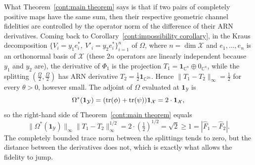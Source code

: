 What Theorem~\ref{cont:main theorem} says is that if two pairs of completely positive maps have the same sum, then their respective geometric channel fidelities are controlled by the operator norm of the difference of their ARN derivatives. Coming back to Corollary~\ref{cont:impossibility corollary}, in the Kraus decomposition $\{V_i=y_1e_i^*,\ V'_i=y_2e_i^*\}_{i=1}^{n}$ of $\Omega$, where $n=\dim\mathcal{X}$ and $e_1,\dots,e_n$ is an orthonormal basis of $\mathcal{X}$ (these $2n$ operators are linearly independent because $y_1$ and $y_2$ are), the derivative of $\Phi_1$ is the projection $T_1=\mathbf{1}_{\mathbb{C}^n}\oplus 0_{\mathbb{C}^n}$, while the splitting $\left(\frac{\Omega}{2}, \frac{\Omega}{2}\right)$ has ARN derivative $T_2=\frac{1}{2}\mathbf{1}_{\mathbb{C}^{2n}}$. Hence $\|T_1-T_2\|_\infty=\frac12$ for every $\theta>0$, however small. The adjoint of $\Omega$ evaluated at $\mathbf{1}_{\mathcal{Y}}$ is 
\[\Omega^*(\mathbf{1}_{\mathcal{Y}})=(\operatorname{tr}(\phi)+\operatorname{tr}(\psi))\mathbf{1}_{\mathcal{X}}=2\cdot\mathbf{1}_{\mathcal{X}},\] so the right-hand side of Theorem~\ref{cont:main theorem} equals
\[
    \|\Omega^*(\mathbf{1}_{\mathcal{Y}})\|_\infty\|T_1-T_2\|_\infty^{1/2}=2\cdot(\tfrac12)^{1/2}=\sqrt{2}\geq 1=|\widehat{F}_1-\widehat{F}_2|.
\]
The completely bounded trace norm between the splittings tends to zero, but the distance between the derivatives does not, which is exactly what allows the fidelity to jump.

